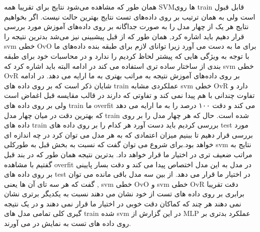 \documentclass{article}
\begin{document}
همان طور که مشاهده می‌شود نتایج برای تقریبا همه SVM‌ها روی train  قابل قبول است ولی به همان ترتیب بر روی داده‌های تست نتایج بهترین حالت نیست. اگر بخواهیم نتایج هر یک از چهار مدل را به صورت جداگانه بر روی داده‌های آموزش مورد بررسی قرار دهیم باید اشاره کرد, همان طور که از قبل پیشبینی نیز می‌شد بدترین نتیجه را svm خطی OvO برای ما به دست می آورد زیرا توانای لازم برای طبقه بنده داده‌های ما با توجه به ویژگی هایی که پیشتر لحاظ کردیم را ندارد و در محاسبات خود برای طبقه بندی از ساختار ساده تری استفاده می کند در ادامه البته باید اشاره کرد که svm خطی OvR بر روی داده‌های آموزش نتیجه به مراتب بهتری به ما ارایه می دهد.\newline
 در ادامه شایان ذکر است که  بر روی داده های train عملکردی مشابه svm خطی OvR دارد و تفاوت چندانی با هم پیدا نمی کند و تفاوتی که دارند در قالب مقایسه قبل اغماض است ولی  بر روی داده های train ما overfit می کند و دقت ۱۰۰ درصد را به ما ارایه می دهد که بهترین دقت در میان چهار مدل train شده است.\newline
حال که هر چهار مدل را بر روی داده های train بررسی کردیم باید دست آورد هر کدام را بر روی داده های test مورد بررسی قرار دهیم تا ببنیم میزان اعتمادی که به هر مدل می توان کرد در چه اندازه ای خواهد بود.برای شروع می توان گفت که نسبت به بخش قبل به طورکلی svm نتایج به مراتب ضعیف تری در اختیار ما قرار خواهد داد.\newline
بدترین نتیجه همان طور که در بند قبل گفتیم با مشاهده overfit در مدل  به این مدل اختصاص پیدا می کند و دقت بسار پایینی بر روی داده های test در اختیار ما قرار می دهد.\newline
از بین سه مدل باقی مانده می توان گفت که هر سه تای آن ها یعنی  , svm خطی OvO و svm خطی OvR دقت تقریبا برابری بر روی داده های تست از خود نشان می دهند نسبت به یکدیگر برتری نشان نمی دهند هر چند که کماکان دقت خوبی در اختیار ما قرار نمی دهند و در یک نتیجه گیری کلی تمامی مدل های train شده svm در این گزارش از MLP عملکرد بدتری بر روی داده های تست به نمایش در می آورند.
\end{document}
